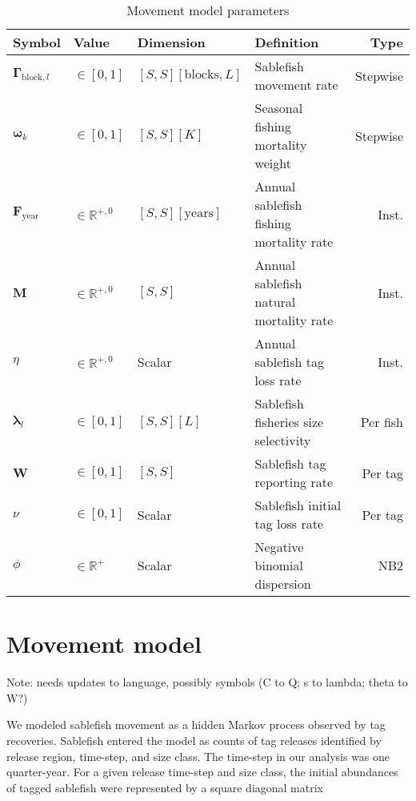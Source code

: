 \documentclass{article}
\begin{document}
\begin{table}[ht]
  \centering
  \caption{Movement model parameters}
  \renewcommand\arraystretch{1.2}
  \label{tab:model-parameters}
  \begin{tabular}{l l l l r}
    \toprule
    \textbf{Symbol} & \textbf{Value} & \textbf{Dimension} & \textbf{Definition} & \textbf{Type} \\
    \toprule
    $\boldsymbol{\Gamma}_{\mathrm{block},l}$ & $\in \left[0, 1 \right]$ & $[S,S][\mathrm{blocks},L]$ & Sablefish movement rate & Stepwise \\
    $\boldsymbol{\omega}_{k}$ &  $\in \left[0, 1 \right]$ & $[S,S][K]$ & Seasonal fishing mortality weight & Stepwise \\
    \midrule
    $\boldsymbol{F}_{\mathrm{year}}$ & $\in \mathbb{R}^{+,0}$ & $[S,S][\mathrm{years}]$ & Annual sablefish fishing mortality rate & Inst. \\
    $\boldsymbol{M}$ & $\in \mathbb{R}^{+,0}$ & $[S,S]$ & Annual sablefish natural mortality rate & Inst. \\
    $\eta$ & $\in \mathbb{R}^{+,0}$ & Scalar & Annual sablefish tag loss rate & Inst. \\    
    \midrule
    $\boldsymbol{\lambda}_{l}$ & $\in \left[0, 1 \right]$ & $[S,S][L]$ & Sablefish fisheries size selectivity & Per fish \\
    $\boldsymbol{W}$ & $\in \left[0, 1 \right]$ & $[S,S]$ & Sablefish tag reporting rate & Per tag \\
    $\nu$ & $\in \left[0, 1 \right]$ & Scalar & Sablefish initial tag loss rate & Per tag \\
    \midrule
    $\phi$ & $\in \mathbb{R}^{+}$ & Scalar & Negative binomial dispersion & NB2 \\
    \bottomrule
  \end{tabular}
\end{table}


\section{Movement model}

\noindent Note: needs updates to language, possibly symbols (C to Q; s to lambda; theta to W?) 

We modeled sablefish movement as a hidden Markov process \cite[][]{langrock-2012-flexible-practical} observed by tag recoveries. Sablefish entered the model as counts of tag releases identified by release region, time-step, and size class. The time-step in our analysis was one quarter-year. For a given release time-step and size class, the initial abundances of tagged sablefish were represented by a square diagonal matrix 
\end{document}

